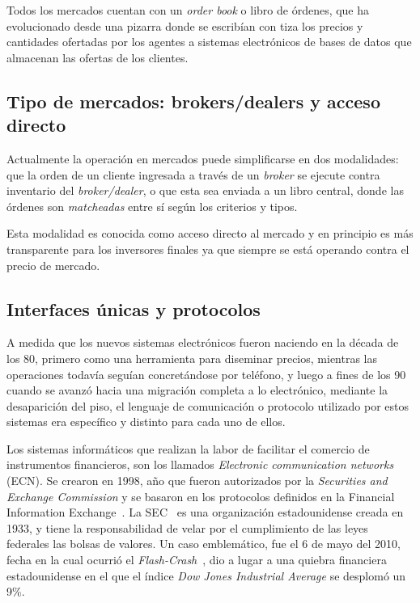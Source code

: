 Todos los mercados cuentan con un \emph{order book} o libro de órdenes, que ha
evolucionado desde una pizarra donde se escribían con tiza los precios y
cantidades ofertadas por los agentes a sistemas electrónicos de bases de datos
que almacenan las ofertas de los clientes.


\subsection{Tipo de mercados: brokers/dealers y acceso directo}

Actualmente la operación en mercados puede simplificarse en dos modalidades:
que la orden de un cliente ingresada a través de un \emph{broker} se ejecute
contra inventario del \emph{broker/dealer}, o que esta sea enviada a un libro
central, donde las órdenes son \emph{matcheadas} entre sí según los criterios y
tipos.

Esta modalidad es conocida como acceso directo al mercado y en principio es más 
transparente para los inversores finales ya que siempre se está operando contra 
el precio de mercado.


\subsection{Interfaces únicas y protocolos}
A medida que los nuevos sistemas electrónicos fueron naciendo en la década de
los 80, primero como una herramienta para diseminar precios, mientras las
operaciones todavía seguían concretándose por teléfono, y luego a fines de los
90 cuando se avanzó hacia una migración completa a lo electrónico, mediante la
desaparición del piso, el lenguaje de comunicación o protocolo utilizado por
estos sistemas era específico y distinto para cada uno de ellos.

Los sistemas informáticos que realizan la labor de facilitar el comercio de
instrumentos financieros, son los llamados \emph{Electronic communication
networks} (ECN).  Se crearon en 1998, año que fueron autorizados por la
\emph{Securities and Exchange Commission} y se basaron en los protocolos
definidos en la Financial Information Exchange~\cite{mcandrews2000emergence}.
La SEC~\cite{hasbrouck2004economic} es una organización estadounidense creada
en 1933, y tiene la responsabilidad de velar por el cumplimiento de las leyes
federales las bolsas de valores. Un caso emblemático, fue el 6 de mayo del
2010, fecha en la cual ocurrió el \emph{Flash-Crash}~\cite{arndt2011high}, dio
a lugar a una quiebra financiera estadounidense en el que el índice \emph{Dow
Jones Industrial Average} se desplomó un 9\%. 

